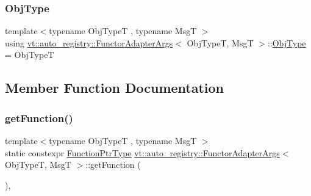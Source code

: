 \mbox{\label{structvt_1_1auto__registry_1_1_functor_adapter_args_3_01_obj_type_t_00_01_msg_t_01_4_a1ba1a1e7fc7320bf4eb1f072212451e9}} 
\subsubsection{\texorpdfstring{Obj\+Type}{ObjType}}
{\footnotesize\ttfamily template$<$typename Obj\+TypeT , typename MsgT $>$ \\
using \hyperlink{structvt_1_1auto__registry_1_1_functor_adapter_args}{vt\+::auto\+\_\+registry\+::\+Functor\+Adapter\+Args}$<$ Obj\+TypeT, MsgT $>$\+::\hyperlink{structvt_1_1auto__registry_1_1_functor_adapter_args_3_01_obj_type_t_00_01_msg_t_01_4_a1ba1a1e7fc7320bf4eb1f072212451e9}{Obj\+Type} =  Obj\+TypeT}



\subsection{Member Function Documentation}
\mbox{\label{structvt_1_1auto__registry_1_1_functor_adapter_args_3_01_obj_type_t_00_01_msg_t_01_4_a55d38cec4b0454ea42be9308bfe77238}} 
\subsubsection{\texorpdfstring{get\+Function()}{getFunction()}}
{\footnotesize\ttfamily template$<$typename Obj\+TypeT , typename MsgT $>$ \\
static constexpr \hyperlink{structvt_1_1auto__registry_1_1_functor_adapter_args_3_01_obj_type_t_00_01_msg_t_01_4_a2ce9fa0acf9d716c816a46240859e1eb}{Function\+Ptr\+Type} \hyperlink{structvt_1_1auto__registry_1_1_functor_adapter_args}{vt\+::auto\+\_\+registry\+::\+Functor\+Adapter\+Args}$<$ Obj\+TypeT, MsgT $>$\+::get\+Function (\begin{DoxyParamCaption}{ }\end{DoxyParamCaption})\hspace{0.3cm}{\ttfamily [inline]}, {\ttfamily [static]}}

